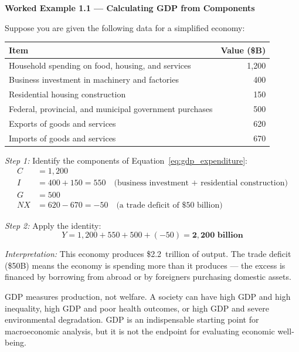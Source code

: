 \noindent\textbf{Worked Example 1.1 --- Calculating GDP from Components}

Suppose you are given the following data for a simplified economy:

\begin{center}
\begin{tabular}{lr}
\toprule
Item & Value (\$B) \\
\midrule
Household spending on food, housing, and services & 1{,}200 \\
Business investment in machinery and factories   &   400  \\
Residential housing construction                  &   150  \\
Federal, provincial, and municipal government purchases & 500 \\
Exports of goods and services                    &   620  \\
Imports of goods and services                    &   670  \\
\bottomrule
\end{tabular}
\end{center}

\noindent\textit{Step 1:} Identify the components of Equation~\eqref{eq:gdp_expenditure}:
\begin{align*}
C &= 1{,}200 \\
I &= 400 + 150 = 550 \quad \text{(business investment + residential construction)} \\
G &= 500 \\
NX &= 620 - 670 = -50 \quad \text{(a trade deficit of \$50 billion)}
\end{align*}

\noindent\textit{Step 2:} Apply the identity:
\[
Y = 1{,}200 + 550 + 500 + (-50) = \mathbf{2{,}200 \text{ billion}}
\]

\noindent\textit{Interpretation:} This economy produces \$2.2~trillion of
output. The trade deficit (\$50B) means the economy is spending more than
it produces --- the excess is financed by borrowing from abroad or by
foreigners purchasing domestic assets.

\begin{keytakeaway}
GDP measures production, not welfare. A society can have high GDP and
high inequality, high GDP and poor health outcomes, or high GDP and
severe environmental degradation. GDP is an indispensable starting point
for macroeconomic analysis, but it is not the endpoint for evaluating
economic well-being.
\end{keytakeaway}

